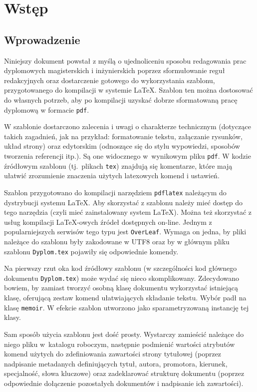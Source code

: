 \chapter{Wstęp}
\section{Wprowadzenie}
Niniejszy dokument powstał z myślą o ujednoliceniu sposobu redagowania prac dyplomowych magisterskich i inżynierskich poprzez sformułowanie reguł redakcyjnych oraz dostarczenie gotowego do wykorzystania szablonu, przygotowanego do kompilacji w systemie \LaTeX{}. Szablon ten można dostosować do własnych potrzeb, aby po kompilacji uzyskać dobrze sformatowaną pracę dyplomową w formacie \texttt{pdf}.  

W szablonie dostarczono zalecenia i uwagi o charakterze technicznym (dotyczące takich zagadnień, jak na przykład: formatowanie tekstu, załączanie rysunków, układ strony) oraz edytorskim (odnoszące się do stylu wypowiedzi, sposobów tworzenia referencji itp.). Są one widocznego w~wynikowym pliku \texttt{pdf}.
W kodzie źródłowym szablonu (tj.\ plikach \texttt{tex}) znajdują się komentarze, które mają ułatwić zrozumienie znaczenia użytych latexowych komend i ustawień. 

Szablon przygotowano do kompilacji narzędziem \texttt{pdflatex} należącym do dystrybucji systemu \LaTeX. Aby skorzystać z szablonu należy mieć dostęp do tego narzędzia (czyli mieć zainstalowany system \LaTeX). Można też skorzystać z usług kompilacji \LaTeX-owych źródeł dostępnych on-line. Jednym z popularniejszych serwisów tego typu jest \texttt{OverLeaf}. Wymaga on jedna, by pliki należące do szablonu były zakodowane w UTF8 oraz by w głównym pliku szablonu \texttt{Dyplom.tex} pojawiły się odpowiednie komendy.

Na pierwszy rzut oka kod źródłowy szablonu (w szczególności kod głównego dokumentu \texttt{Dyplom.tex}) może wydać się nieco skomplikowany. Zdecydowano bowiem, by zamiast tworzyć osobną klasę dokumentu wykorzystać istniejącą klasę, oferującą zestaw komend ułatwiających składanie tekstu. Wybór padł na klasę \texttt{memoir}. W efekcie szablon utworzono jako sparametryzowaną instancję tej klasy. 

Sam sposób użycia szablonu jest dość prosty. Wystarczy zamieścić należące do niego pliku w~katalogu roboczym, następnie podmienić wartości atrybutów komend użytych do zdefiniowania zawartości strony tytułowej (poprzez nadpisanie metadanych definiujących tytuł, autora, promotora, kierunek, specjalność, słowa kluczowe) oraz zadeklarować strukturę dokumentu (poprzez odpowiednie dołączenie pozostałych dokumentów i nadpisanie ich zawartości). 

